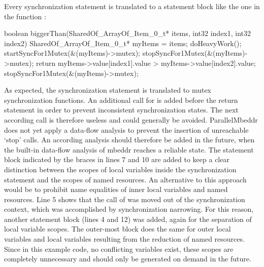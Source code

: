 Every synchronization statement is translated to a statement block like the one in the function :
\begin{ccode}
boolean biggerThan(SharedOf_ArrayOf_Item_0_t* items, int32 index1, int32 index2) {
  { 
    SharedOf_ArrayOf_Item_0_t* myItems = items; 
    { 
      doHeavyWork(); 
      startSyncFor1Mutex(&(myItems)->mutex); 
      { 
        stopSyncFor1Mutex(&(myItems)->mutex); 
        return myItems->value[index1].value > myItems->value[index2].value; 
      } 
      stopSyncFor1Mutex(&(myItems)->mutex); 
    } 
  }
}
\end{ccode}
As expected, the synchronization statement is translated to mutex synchronization functions. An additional call for  is added before the return statement in order to prevent inconsistent synchronization states. The next according call is therefore useless and could generally be avoided. ParallelMbeddr does not yet apply a data-flow analysis to prevent the insertion of unreachable `stop' calls. An according analysis should therefore be added in the future, when the built-in data-flow analysis of mbeddr reaches a reliable state. The statement block indicated by the braces in lines 7 and 10 are added to keep a clear distinction between the scopes of local variables inside the synchronization statement and the scopes of named resources. An alternative to this approach would be to prohibit name equalities of inner local variables and named resources. Line 5 shows that the call of  was moved out of the synchronization context, which was accomplished by synchronization narrowing. For this reason, another statement block (lines 4 and 12) was added, again for the separation of local variable scopes. The outer-most block does the same for outer local variables and local variables resulting from the reduction of named resources. Since in this example code, no conflicting variables exist, these scopes are completely unnecessary and should only be generated on demand in the future.

